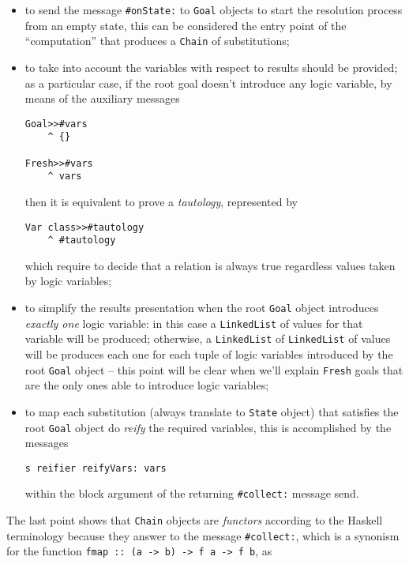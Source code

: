 \documentclass[a4paper,12pt]{article}
\begin{document}
\begin{itemize}

\item to send the message \Verb|#onState:| to \Verb|Goal| objects to start the
resolution process from an empty state, this can be considered the entry point of
the ``computation'' that produces a \Verb|Chain| of substitutions;

\item to take into account the variables with respect to results should be
provided; as a particular case, if the root goal doesn't introduce any logic
variable, by means of the auxiliary messages
\begin{verbatim}
Goal>>#vars
    ^ {}

Fresh>>#vars
    ^ vars
\end{verbatim}
then it is equivalent to prove a \textit{tautology}, represented by
\begin{verbatim}
Var class>>#tautology
    ^ #tautology
\end{verbatim}
which require to decide that a relation is always true regardless values taken
by logic variables;

\item to simplify the results presentation when the root \Verb|Goal| object
introduces \textit{exactly one} logic variable: in this case a
\Verb|LinkedList| of values for that variable will be produced; otherwise, a
\Verb|LinkedList| of \Verb|LinkedList| of values will be produces each one for
each tuple of logic variables introduced by the root \Verb|Goal| object -- this
point will be clear when we'll explain \Verb|Fresh| goals that are the only
ones able to introduce logic variables;

\item to map each substitution (always translate to \Verb|State| object) that
satisfies the root \Verb|Goal| object do \textit{reify} the required variables,
this is accomplished by the messages
\begin{verbatim}
s reifier reifyVars: vars
\end{verbatim}
within the block argument of the returning \Verb|#collect:| message send.
\end{itemize}
The last point shows that \Verb|Chain| objects are \textit{functors} according
to the Haskell terminology because they answer to the message \Verb|#collect:|,
which is a synonism for the function \Verb|fmap :: (a -> b) -> f a -> f b|, as
\end{document}
